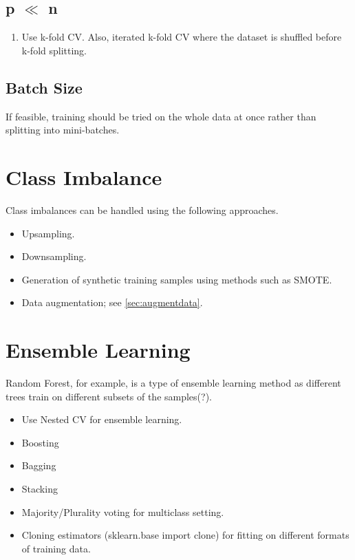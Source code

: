 \documentclass[a4paper, 12pt]{report}
\begin{document}
\subsection{p ${\ll}$ n}
\begin{enumerate}
\item Use k-fold CV. Also, iterated k-fold CV where the dataset is shuffled before k-fold splitting.
\end{enumerate}

\subsection{Batch Size}
If feasible, training should be tried on the whole data at once rather than splitting into mini-batches.



\section{Class Imbalance}
Class imbalances can be handled using the following approaches.
\begin{itemize}
\item Upsampling.
\item Downsampling.
\item Generation of synthetic training samples using methods such as SMOTE.
\item Data augmentation; see \autoref{sec:augmentdata}. 
\end{itemize}


\section{Ensemble Learning}
Random Forest, for example, is a type of ensemble learning method as different trees train on {\color{red}different subsets of the samples(?)}.

\begin{itemize}
\item Use Nested CV for ensemble learning.
\item Boosting
\item Bagging
\item Stacking
\item Majority/Plurality voting for multiclass setting.
\item Cloning estimators ({\color{cyan}sklearn.base import clone}) for fitting on different formats of training data.
\end{itemize}
\end{document}
